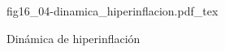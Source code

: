\begin{figure}[h]
\centering
\def\svgwidth{0.5\textwidth}
{fig16_04-dinamica_hiperinflacion.pdf_tex}
\caption{Dinámica de hiperinflación}
\label{fig16_04-dinamica_hiperinflacion}
\end{figure}